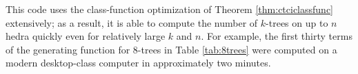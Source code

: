 \documentclass[distribution,draft]{brandiss} %
\numberwithin{section}{chapter}
\numberwithin{figure}{chapter}
\begin{document}
This code uses the class-function optimization of Theorem \ref{thm:ctciclassfunc} extensively; as a result, it is able to compute the number of $k$-trees on up to $n$ hedra quickly even for relatively large $k$ and $n$.
For example, the first thirty terms of the generating function for $8$-trees in Table \ref{tab:8trees} were computed on a modern desktop-class computer in approximately two minutes.



\backmatter



\end{document}
